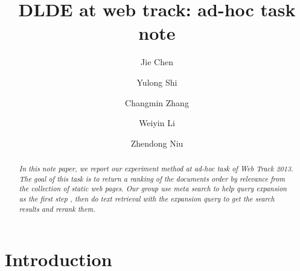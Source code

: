 \documentclass[runningheads,a4paper]{llncs}
\begin{document}
\mainmatter  %

\title{DLDE at web track: ad-hoc task note}


%
%
\author{Jie Chen \and Yulong Shi \and Changmin Zhang \and Weiyin Li \and Zhendong Niu}

%


%
%

\maketitle

\begin{abstract}
\emph{In this note paper, we report our experiment method at ad-hoc task of Web Track 2013. The goal of this task is to return a ranking of the documents order by relevance from the collection of static web pages. Our group use meta search to help query expansion as the first step , then do text retrieval with the expansion query to get the search results and rerank them. }
\end{abstract}

\section{Introduction}
\end{document}
